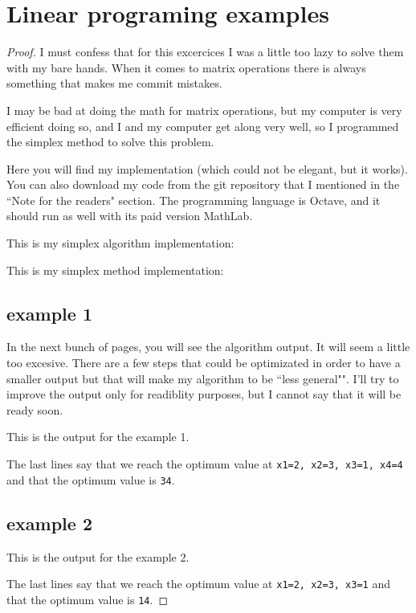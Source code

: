 ﻿\chapter{Linear programing examples}


\begin{proof}
    I must confess that for this excercices I was a little too lazy to solve them with my bare hands.
    When it comes to matrix operations there is always something that makes me commit mistakes.\pn
    
    I may be bad at doing the math for matrix operations, but my computer is very efficient doing so,
    and I and my computer get along  very well, so I programmed the simplex method to solve this problem.\pn
    
    Here you will find my implementation (which could not be elegant, but it works). You can also download my code from
		the git repository that I mentioned in the ``Note for the readers" section. The programming language is Octave, and it should
		run as well with its paid version MathLab.\pn
    
		\newpage
    This is my simplex algorithm implementation:
		\small
    
		\normalsize
		
		\newpage
    This is my simplex method implementation:
		\small
    
		\normalsize
		
		
		\newpage
		\section{example 1}
		In the next bunch of pages, you will see the algorithm output. It will seem a little too excesive. 
		There are a few steps that could be optimizated in order to have a smaller output but that will make
		my algorithm to be ``less general"". I'll try to improve the output only for readiblity purposes,
		but I cannot say that it will be ready soon.\pn
		
    This is the output for the example 1.
		\small
    
		\normalsize
		The last lines say that we reach the optimum value at \texttt{x1=2, x2=3, x3=1, x4=4} and that the optimum value is \texttt{34}.
		
		\newpage
		\section{example 2}
    This is the output for the example 2.
		\small
    
		\normalsize
		The last lines say that we reach the optimum value at \texttt{x1=2, x2=3, x3=1} and that the optimum value is \texttt{14}.
\end{proof}